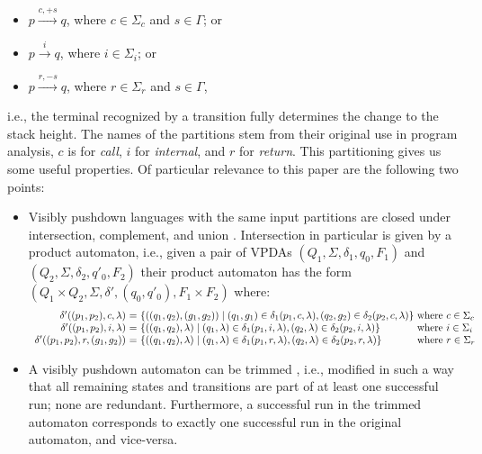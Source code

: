 \documentclass[acmsmall,review,anonymous]{acmart}\settopmatter{printfolios=true,printccs=false,printacmref=false}
\newcommand{\T}{\Sigma} %
\begin{document}
\begin{itemize}
\item $p \xrightarrow{c, +s} q$, where $c \in \T_c$ and $s \in \Gamma$; or
\item $p \xrightarrow{i} q$, where $i \in \T_i$; or
\item $p \xrightarrow{r, -s} q$, where $r \in \T_r$ and $s \in \Gamma$,
\end{itemize}

\noindent i.e., the terminal recognized by a transition fully determines the change to the stack height.
%
The names of the partitions stem from their original use in program analysis, $c$ is for \emph{call}, $i$ for \emph{internal}, and $r$ for \emph{return}.
%
This partitioning gives us some useful properties. Of particular relevance to this paper are the following two points:

\begin{itemize}
\item Visibly pushdown languages with the same input partitions are closed under intersection, complement, and union \cite{alurVisiblyPushdownLanguages2004}. Intersection in particular is given by a product automaton, i.e., given a pair of VPDAs $(Q_1, \T, \delta_1, q_0, F_1)$ and $(Q_2, \T, \delta_2, q'_0, F_2)$ their product automaton has the form $(Q_1 \times Q_2, \T, \delta', (q_0, q'_0), F_1 \times F_2)$ where:
  $$
  \begin{array}{r@{\ =\ }ll}
    \delta'((p_1, p_2), c, \lambda) & \{((q_1, q_2), (g_1, g_2)) \mid (q_1, g_1) \in \delta_1(p_1, c, \lambda), (q_2, g_2) \in \delta_2(p_2, c, \lambda) \} & \!\!\!\!\text{where } c \in \T_c \\
    \delta'((p_1, p_2), i, \lambda) & \{((q_1, q_2), \lambda) \mid (q_1, \lambda) \in \delta_1(p_1, i, \lambda), (q_2, \lambda) \in \delta_2(p_2, i, \lambda) \} & \!\!\!\!\text{where } i \in \T_i \\
    \delta'((p_1, p_2), r, (g_1, g_2)) & \{((q_1, q_2), \lambda) \mid (q_1, \lambda) \in \delta_1(p_1, r, \lambda), (q_2, \lambda) \in \delta_2(p_2, r, \lambda) \} & \!\!\!\!\text{where } r \in \T_r \\
  \end{array}
  $$

\item A visibly pushdown automaton can be trimmed \cite{caralpTrimmingVisiblyPushdown2015}, i.e., modified in such a way that all remaining states and transitions are part of at least one successful run; none are redundant. Furthermore, a successful run in the trimmed automaton corresponds to exactly one successful run in the original automaton, and vice-versa.
\end{itemize}
\end{document}
